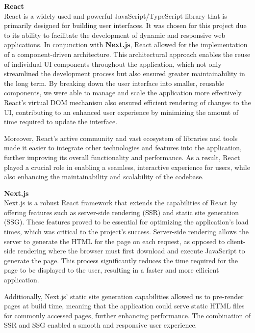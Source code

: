 \vspace{0.5cm}

\textbf{React} \\
React is a widely used and powerful JavaScript/TypeScript library that is
primarily designed for building user interfaces. It was chosen for this
project due to its ability to facilitate the development of dynamic and
responsive web applications. In conjunction with \textbf{Next.js}, React
allowed for the implementation of a component{-}driven architecture. This
architectural approach enables the reuse of individual UI components
throughout the application, which not only streamlined the development
process but also ensured greater maintainability in the long term. By
breaking down the user interface into smaller, reusable components, we were
able to manage and scale the application more effectively. React's virtual
DOM mechanism also ensured efficient rendering of changes to the UI,
contributing to an enhanced user experience by minimizing the amount of
time required to update the interface.

Moreover, React's active community and vast ecosystem of libraries and tools
made it easier to integrate other technologies and features into the
application, further improving its overall functionality and performance. As
a result, React played a crucial role in enabling a seamless, interactive
experience for users, while also enhancing the maintainability and
scalability of the codebase.

\vspace{0.5cm}

\textbf{Next.js} \\
Next.js is a robust React framework that extends the capabilities of React
by offering features such as server{-}side rendering (SSR) and static site
generation (SSG). These features proved to be essential for optimizing the
application's load times, which was critical to the project's success.
Server{-}side rendering allows the server to generate the HTML for the page
on each request, as opposed to client{-}side rendering where the browser
must first download and execute JavaScript to generate the page. This
process significantly reduces the time required for the page to be displayed
to the user, resulting in a faster and more efficient application.

Additionally, Next.js' static site generation capabilities allowed us to
pre{-}render pages at build time, meaning that the application could serve
static HTML files for commonly accessed pages, further enhancing
performance. The combination of SSR and SSG enabled a smooth and responsive
user experience.


